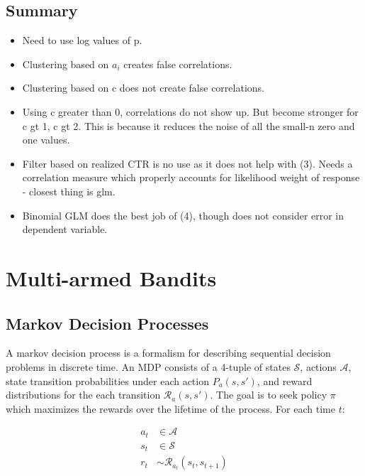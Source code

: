 \documentclass[11pt,a4,singlespacing,titlepagenumber=on]{scrreprt}
\numberwithin{equation}{chapter} %
\theoremstyle{remark}
\begin{document}
\section{Summary}

\begin{itemize}
	\item Need to use log values of p.
	\item Clustering based on $a_i$ creates false correlations.
	\item Clustering based on c does not create false correlations.
	\item Using c greater than 0, correlations do not show up. But become stronger for c gt 1, c gt 2. This is because it reduces the noise of all the small-n zero and one values.
	\item Filter based on realized CTR is no use as it does not help with (3). Needs a correlation measure which properly accounts for likelihood weight of response - closest thing is glm.
	\item Binomial GLM does the best job of (4), though does not consider error in dependent variable.
\end{itemize}


\chapter{ Multi-armed Bandits}

\section{ Markov Decision Processes }

A markov decision process is a formalism for describing sequential decision problems in discrete time. An MDP consists of a 4-tuple of states $\mathcal{S}$, actions $\mathcal{A}$, state transition probabilities under each action $P_a(s,s')$, and reward distributions for the each transition $\mathcal{R}_a(s,s')$. The goal is to seek policy $\pi$ which maximizes the rewards over the lifetime of the process. For each time $t$:

\begin{align}
a_t &\in \mathcal{A} \\
s_t &\in \mathcal{S} \\
r_t &\sim \mathcal{R}_{a_t}(s_t,s_{t+1})
\end{align}
\end{document}
